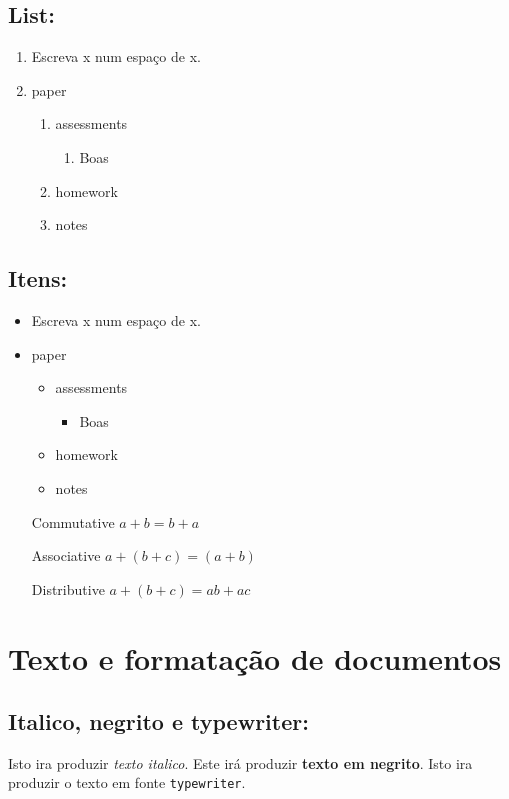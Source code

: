 \documentclass[a4paper,20pt,hidelinks]{article}
\begin{document}
 \subsection{List:}
 \begin{enumerate}
  \item Escreva x num espaço de x.
  \item paper
  \begin{enumerate}
   \item assessments
   \begin {enumerate}
   \item Boas
   \end {enumerate}
   \item homework
   \item notes
  \end{enumerate}
 \end{enumerate}  

 \subsection{Itens:}
 \begin{itemize}
  \item Escreva x num espaço de x.
  \item paper
  \begin{itemize}
   \item assessments
   \begin {itemize}
   \item Boas
   \end {itemize}
   \item homework
   \item notes
  \end{itemize}
 \end{itemize}  

 \begin{enumerate}
  \item[Commutative]$a+b=b+a$
  \item[Associative]$a+(b+c)=(a+b)$
  \item[Distributive]$a+(b+c)=ab+ac$
 \end{enumerate}
 
 \newpage
\section{Texto e formatação de documentos}
\subsection{Italico, negrito e typewriter:}
Isto ira produzir \textit{texto italico}.
Este irá produzir \textbf{texto em negrito}.
Isto ira produzir o texto em fonte \texttt{typewriter}.
\end{document}
